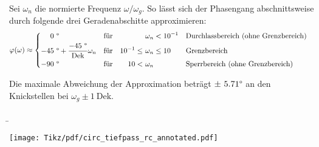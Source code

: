 \begin{frame}
{    %
    Sei $\omega_n$ die normierte Frequenz $\omega/\omega_g$. So lässt sich der Phasengang abschnittsweise durch folgende drei Geradenabschitte approximieren:
    \begin{equation}
        \varphi(\omega) \approx
            \begin{cases}%
                \begin{aligned}%
                    0\ &\degree
                        &&\text{für}&                    &\omega_n < 10^{-1}     &&\text{Durchlassbereich (ohne Grenzbereich)}\\
                    -45\ &\degree + \frac{-45\ \degree}{\mathrm{Dek}}\omega_n
                        &&\text{für}&    10^{-1} \leq\   &\omega_n \leq 10       &&\text{Grenzbereich}\\
                    -90\ &\degree
                        &&\text{für}&    10 <\           &\omega_n               &&\text{Sperrbereich (ohne Grenzbereich)}
                \end{aligned}
            \end{cases}
    \end{equation}

    Die maximale Abweichung der Approximation beträgt  $\pm\ 5.71\degree$ an den Knickstellen bei $\omega_g\pm 1\ \mathrm{Dek}$.
}%
\b{%
    \noindent\begin{minipage}[t]{\textwidth}
        \begin{minipage}[t]{\dimexpr0.5\textwidth-\Colsep\relax}%
            \centering\vspace{0pt}%
            \texttt{[image: Tikz/pdf/circ\_tiefpass\_rc\_annotated.pdf]}


\end{minipage}
\end{minipage}}
\end{frame}
